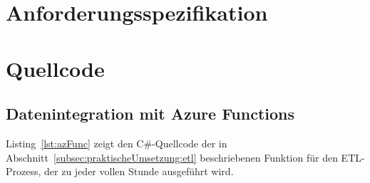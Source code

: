 \chapter{Anforderungsspezifikation} \label{ch:anforderungsspezifikation}
\begin{small}


\end{small}

\chapter{Quellcode} \label{ch:quellcode}
\section{Datenintegration mit Azure Functions}
Listing~\ref{lst:azFunc} zeigt den  C\#-Quellcode der in Abschnitt~\ref{subsec:praktischeUmsetzung:etl} beschriebenen Funktion für den ETL-Prozess, der zu jeder vollen Stunde ausgeführt wird.
